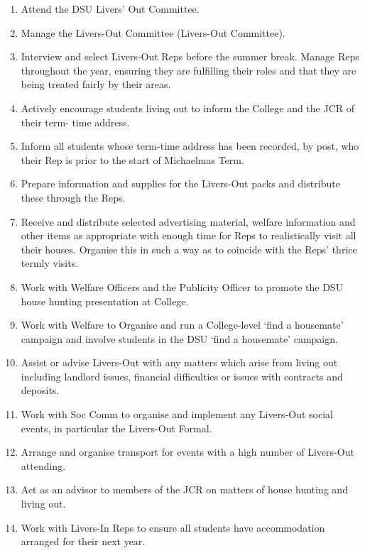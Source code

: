 \begin{enumerate}
    \item Attend the DSU Livers’ Out Committee.
    \item Manage the Livers-Out Committee (Livers-Out Committee).
    \item Interview and select Livers-Out Reps before the summer break. Manage Reps throughout the year, ensuring they are fulfilling their roles and that they are being treated fairly by their areas.
    \item Actively encourage students living out to inform the College and the JCR of their term- time address.
    \item Inform all students whose term-time address has been recorded, by post, who their Rep is prior to the start of Michaelmas Term.
    \item Prepare information and supplies for the Livers-Out packs and distribute these through the Reps.
    \item Receive and distribute selected advertising material, welfare information and other items as appropriate with enough time for Reps to realistically visit all their houses. Organise this in such a way as to coincide with the Reps' thrice termly visits.
    \item Work with Welfare Officers and the Publicity Officer to promote the DSU house hunting presentation at College.
    \item Work with Welfare to Organise and run a College-level ‘find a housemate’ campaign and involve students in the DSU ‘find a housemate’ campaign.
    \item Assist or advise Livers-Out with any matters which arise from living out including landlord issues, financial difficulties or issues with contracts and deposits.
    \item Work with Soc Comm to organise and implement any Livers-Out social events, in particular the Livers-Out Formal.
    \item Arrange and organise transport for events with a high number of Livers-Out attending.
    \item Act as an advisor to members of the JCR on matters of house hunting and living out.
    \item Work with Livers-In Reps to ensure all students have accommodation arranged for their next year.
\end{enumerate}

